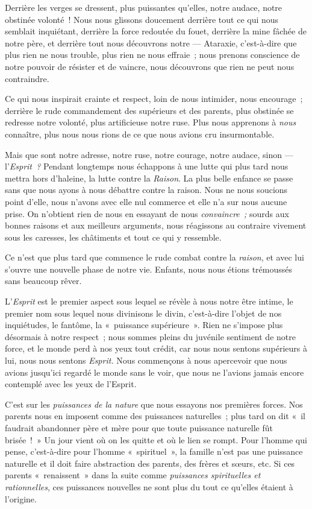 \documentclass[french,twoside]{book} %
\begin{document}
Derrière les verges se dressent, plus puissantes qu’elles, notre audace, notre obstinée volonté ! Nous nous glissons doucement derrière tout ce qui nous semblait inquiétant, derrière la force redoutée du fouet, derrière la mine fâchée de notre père, et derrière tout nous découvrons notre — Ataraxie, c’est-à-dire que plus rien ne nous trouble, plus rien ne nous effraie ; nous prenons conscience de notre pouvoir de résister et de vaincre, nous découvrons que rien ne peut nous contraindre.\par
Ce qui nous inspirait crainte et respect, loin de nous intimider, nous encourage ; derrière le rude commandement des supérieurs et des parents, plus obstinée se redresse notre volonté, plus artificieuse notre ruse. Plus nous apprenons à \emph{nous} connaître, plus nous nous rions de ce que nous avions cru insurmontable.\par
Mais que sont notre adresse, notre ruse, notre courage, notre audace, sinon — l’\emph{Esprit ?} Pendant longtemps nous échappons à une lutte qui plus tard nous mettra hors d’haleine, la lutte contre la \emph{Raison}. La plus belle enfance se passe sans que nous ayons à nous débattre contre la raison. Nous ne nous soucions point d’elle, nous n’avons avec elle nul commerce et elle n’a sur nous aucune prise. On n’obtient rien de nous en essayant de nous \emph{convaincre ;} sourds aux bonnes raisons et aux meilleurs arguments, nous réagissons au contraire vivement sous les caresses, les châtiments et tout ce qui y ressemble.\par
 Ce n’est que plus tard que commence le rude combat contre la \emph{raison}, et avec lui s’ouvre une nouvelle phase de notre vie. Enfants, nous nous étions trémoussés sans beaucoup rêver.\par
L’\emph{Esprit} est le premier aspect sous lequel se révèle à nous notre être intime, le premier nom sous lequel nous divinisons le divin, c’est-à-dire l’objet de nos inquiétudes, le fantôme, la « puissance supérieure ». Rien ne s’impose plus désormais à notre respect ; nous sommes pleins du juvénile sentiment de notre force, et le monde perd à nos yeux tout crédit, car nous nous sentons supérieurs à lui, nous nous sentons \emph{Esprit.} Nous commençons à nous apercevoir que nous avions jusqu’ici regardé le monde sans le voir, que nous ne l’avions jamais encore contemplé avec les yeux de l’Esprit.\par
C’est sur les \emph{puissances de la nature} que nous essayons nos premières forces. Nos parents nous en imposent comme des puissances naturelles ; plus tard on dit « il faudrait abandonner père et mère pour que toute puissance naturelle fût brisée ! » Un jour vient où on les quitte et où le lien se rompt. Pour l’homme qui pense, c’est-à-dire pour l’homme « spirituel », la famille n’est pas une puissance naturelle et il doit faire abstraction des parents, des frères et sœurs, etc. Si ces parents « renaissent » dans la suite comme \emph{puissances spirituelles et rationnelles}, ces puissances nouvelles ne sont plus du tout ce qu’elles étaient à l’origine.\par
\end{document}
